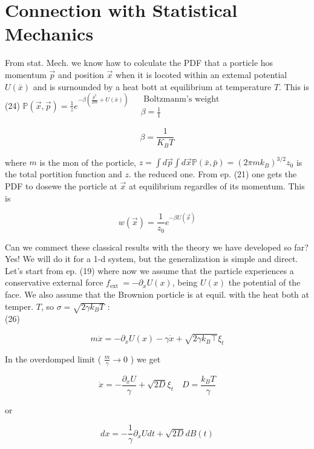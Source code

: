 \documentclass[10pt]{article}
\begin{document}
\section*{Connection with Statistical Mechanics}
From stat. Mech. we know haw to colculate the PDF that a porticle hos momentum $\vec{p}$ and position $\vec{x}$ when it is locoted within an extemal potential $U(\bar{x})$ and is surnounded by a heat bott at equilibrium at temperature $T$. This is\\
(24) $\mathbb{P}(\vec{x}, \vec{p})=\frac{1}{z} e^{-\beta\left(\frac{\bar{p}^{2}}{2 m}+U(\bar{x})\right)} \quad \begin{gathered}\text { Boltzmanm's weight } \\ \beta=\frac{1}{1}\end{gathered}$

$$
\beta=\frac{1}{K_{B} T}
$$

where $m$ is the mon of the porticle, $z=\int d \vec{p} \int d \vec{x} \mathbb{P}(\bar{x}, \bar{p})=\left(2 \pi m k_{B}\right)^{3 / 2} z_{0}$ is the total portition function and $z$. the reduced one. From ep. (21) one gets the PDF to dosewe the porticle at $\vec{x}$ at equilibrium regardles of its momentum. This is


\begin{equation*}
w(\vec{x})=\frac{1}{z_{0}} e^{-\beta U(\vec{x})} \tag{25}
\end{equation*}


Can we commect these classical results with the theory we have developed so far? Yes! We will do it for a 1-d system, but the generalization is simple and direct. Let's start from ep. (19) where now we assume that the particle experiences a conservative external force $f_{\text {ext }}=-\partial_{x} U(x)$, being $U(x)$ the potential of the face. We also assume that the Brownion porticle is at equil. with the heat both at temper. $T$, so $\sigma=\sqrt{2 \gamma k_{B} T}$ :\\
(26)

$$
m \ddot{x}=-\partial_{x} U(x)-\gamma \dot{x}+\sqrt{2 \gamma k_{B} \top} \xi_{t}
$$

In the overdomped limit ( $\frac{m}{\gamma} \rightarrow 0$ ) we get


\begin{equation*}
\dot{x}=-\frac{\partial_{x} U}{\gamma}+\sqrt{2 D} \xi_{t} \quad D=\frac{k_{B} T}{\gamma} \tag{23}
\end{equation*}


or

$$
d x=-\frac{1}{\gamma} \partial_{x} U d t+\sqrt{2 D} d B(t)
$$
\end{document}

